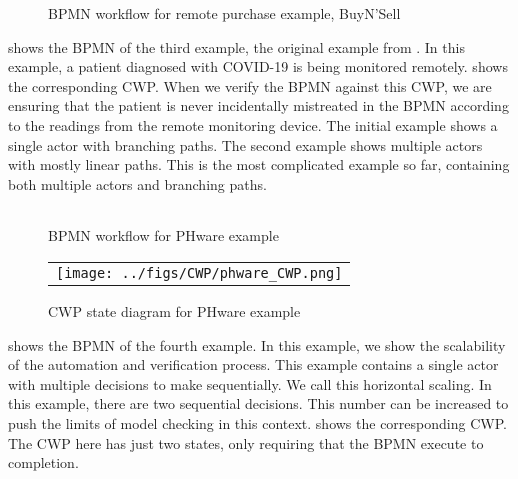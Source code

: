 \begin{figure*}[t]
  \begin{center}
    \begin{tabular}{c}
        
    \end{tabular}
  \end{center}
\caption{BPMN workflow for remote purchase example, BuyN'Sell}
\label{fig:buynsell_bpmn}
\end{figure*}

 shows the BPMN of the third example, the original example from \cite{mercer22}. In this example, a patient diagnosed with COVID-19 is being monitored remotely.  shows the corresponding CWP. When we verify the BPMN against this CWP, we are ensuring that the patient is never incidentally mistreated in the BPMN according to the readings from the remote monitoring device. The initial example shows a single actor with branching paths. The second example shows multiple actors with mostly linear paths. This is the most complicated example so far, containing both multiple actors and branching paths.

\begin{figure*}[t]
  \begin{center}
    \begin{tabular}{c}
        
    \end{tabular}
  \end{center}
\caption{BPMN workflow for PHware example}
\label{fig:phware_bpmn}
\end{figure*}

\begin{figure*}[t]
  \begin{center}
    \begin{tabular}{c}
        \texttt{[image: ../figs/CWP/phware\_CWP.png]}
    \end{tabular}
  \end{center}
\caption{CWP state diagram for PHware example}
\label{fig:phware_cwp}
\end{figure*}

 shows the BPMN of the fourth example. In this example, we show the scalability of the automation and verification process. This example contains a single actor with multiple decisions to make sequentially. We call this horizontal scaling. In this example, there are two sequential decisions. This number can be increased to push the limits of model checking in this context.  shows the corresponding CWP. The CWP here has just two states, only requiring that the BPMN execute to completion.

